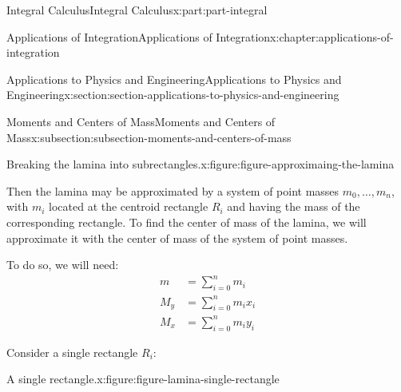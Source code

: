 \documentclass[twoside,10pt,]{book}
\numberwithin{equation}{part}
\newcommand{\amp}{&}
\begin{document}
\begin{partptx}{Integral Calculus}{}{Integral Calculus}{}{}{x:part:part-integral}
\begin{chapterptx}{Applications of Integration}{}{Applications of Integration}{}{}{x:chapter:applications-of-integration}
\begin{sectionptx}{Applications to Physics and Engineering}{}{Applications to Physics and Engineering}{}{}{x:section:section-applications-to-physics-and-engineering}
\begin{subsectionptx}{Moments and Centers of Mass}{}{Moments and Centers of Mass}{}{}{x:subsection:subsection-moments-and-centers-of-mass}
\begin{figureptx}{Breaking the lamina into subrectangles.}{x:figure:figure-approximaing-the-lamina}{}
\begin{image}{0}{1}{0}
{
}%
\end{image}%
\tcblower
\end{figureptx}%
Then the lamina may be approximated by a system of point masses \(m_{0},\ldots,m_{n}\), with \(m_{i}\) located at the centroid rectangle \(R_{i}\) and having the mass of the corresponding rectangle. To find the center of mass of the lamina, we will approximate it with the center of mass of the system of point masses.%
\par
To do so, we will need:%
\begin{align*}
m \amp= \sum_{i=0}^{n}m_{i}\\
M_{y} \amp= \sum_{i=0}^{n}m_{i}x_{i}\\
M_{x} \amp= \sum_{i=0}^{n}m_{i}y_{i}
\end{align*}
%
\par
Consider a single rectangle \(R_{i}\):%
\begin{figureptx}{A single rectangle.}{x:figure:figure-lamina-single-rectangle}{}%
\begin{image}{0}{1}{0}%
\end{image}
\end{figureptx}
\end{subsectionptx}
\end{sectionptx}
\end{chapterptx}
\end{partptx}
\end{document}
